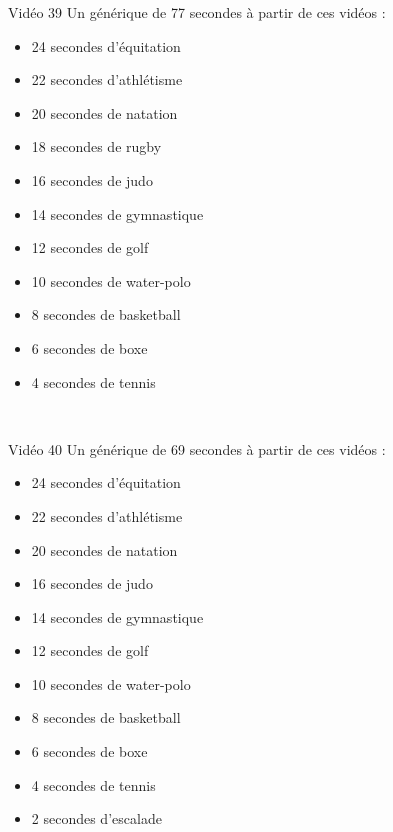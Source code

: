 \documentclass[10pt, a5paper,twoside]{article}
\begin{document}
\begin{card}[width = \textwidth, colback = olympicviolet, colframe = olympicviolet, bottomtitle = 2mm]{Vidéo 39}
  Un générique de 77 secondes à partir de ces vidéos :
  \vspace{-1mm}\begin{itemize}
    \item 24 secondes d'équitation
    \item 22 secondes d'athlétisme
    \item 20 secondes de natation
    \item 18 secondes de rugby
    \item 16 secondes de judo
    \item 14 secondes de gymnastique
    \item 12 secondes de golf
    \item 10 secondes de water-polo
    \item 8 secondes de basketball
    \item 6 secondes de boxe
    \item 4 secondes de tennis
  \end{itemize}
\end{card}

\vfill

\clearpage
~
\vfill

\begin{card}[width = \textwidth, colback = olympicviolet, colframe = olympicviolet, bottomtitle = 2mm]{Vidéo 40}
  Un générique de 69 secondes à partir de ces vidéos :
  \vspace{-1mm}\begin{itemize}
    \item 24 secondes d'équitation
    \item 22 secondes d'athlétisme
    \item 20 secondes de natation
    \item 16 secondes de judo
    \item 14 secondes de gymnastique
    \item 12 secondes de golf
    \item 10 secondes de water-polo
    \item 8 secondes de basketball
    \item 6 secondes de boxe
    \item 4 secondes de tennis
    \item 2 secondes d'escalade
  \end{itemize}
\end{card}

\vfill
\end{document}
